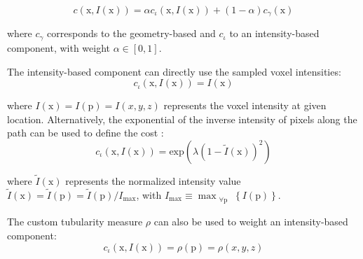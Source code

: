 \begin{equation}
c(\mathrm{x}, I(\mathrm{x})) = \alpha c_{\iota}(\mathrm{x}, I(\mathrm{x})) + (1-\alpha) c_{\gamma}(\mathrm{x}) 
\label{ch1_eq4}
\end{equation}

where $c_{\gamma}$ corresponds to the geometry-based and $c_{\iota}$ to an intensity-based component, with weight $ \alpha \in \left[ 0, 1 \right] $. 

The intensity-based component can directly use the sampled voxel intensities:
\begin{equation}
c_{\iota}( \mathrm{x}, I(\mathrm{x}) ) = I(\mathrm{x})
\end{equation}

where $I(\mathrm{x}) = I(\mathrm{p}) = I(x, y, z)$ represents the voxel intensity at given location. Alternatively, the exponential of the inverse intensity of pixels along the path can be used to define the cost \cite{peng2010automatic}:
\begin{equation}
c_{\iota}( \mathrm{x}, I(\mathrm{x}) ) = \text{exp} \left(  \lambda  (1 - \tilde{I}(\mathrm{x}))^2 \right)
\end{equation}

where $\tilde{I}(\mathrm{x})$ represents the normalized intensity value $ \tilde{I}(\mathrm{x}) = \tilde{I}(\mathrm{p}) = \tilde{I}(\mathrm{p}) / I_{\text{max}}$, with $I_{\text{max}} \equiv \max_{\substack{\forall \mathrm{p}}} \left\lbrace  I(\mathrm{p}) \right\rbrace $.

The custom tubularity measure $\rho$ can also be used to weight an intensity-based component:
\begin{equation}
c_{\iota}( \mathrm{x}, I(\mathrm{x}) ) = \rho(\mathrm{p}) = \rho(x, y, z)
\end{equation}

